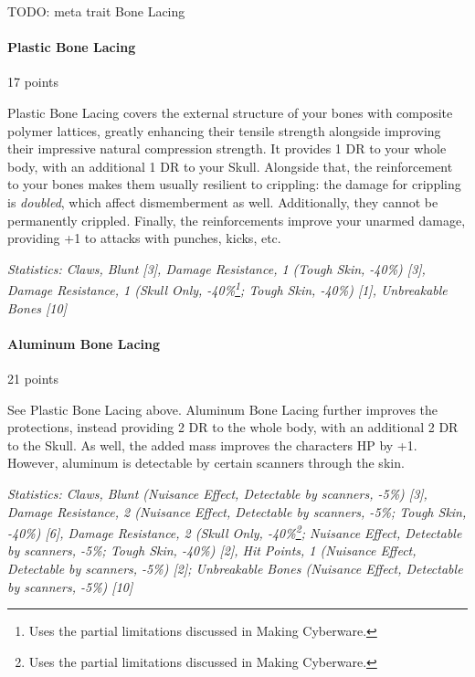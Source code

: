 \begin{multicols*}{3}
	TODO:  meta trait Bone Lacing 
	
	\paragraph{Plastic Bone Lacing}
	\begin{flushright}
		17 points
	\end{flushright}
	
	Plastic Bone Lacing covers the external structure of your bones with composite polymer lattices, greatly enhancing their tensile strength alongside improving their impressive natural compression strength. It provides 1 DR to your whole body, with an additional 1 DR to your Skull. Alongside that, the reinforcement to your bones makes them usually resilient to crippling: the damage for crippling is \textit{doubled}, which affect dismemberment as well. Additionally, they cannot be permanently crippled. Finally, the reinforcements improve your unarmed damage, providing +1 to attacks with punches, kicks, etc.
	
	\textit{\textcolor{OliveGreen}{Statistics: Claws, Blunt [3], Damage Resistance, 1 (Tough Skin, -40\%) [3], Damage Resistance, 1 (Skull Only, -40\%\footnote {Uses the partial limitations discussed in Making Cyberware.}; Tough Skin, -40\%) [1], Unbreakable Bones [10]}}
	
	\paragraph{Aluminum Bone Lacing}
	\begin{flushright}
		21 points
	\end{flushright}
	
	See Plastic Bone Lacing above. Aluminum Bone Lacing further improves the protections, instead providing 2 DR to the whole body, with an additional 2 DR to the Skull. As well, the added mass improves the characters HP by +1. However, aluminum is detectable by certain scanners through the skin.
	
	\textit{\textcolor{OliveGreen}{Statistics: Claws, Blunt (Nuisance Effect, Detectable by scanners,  -5\%) [3], Damage Resistance, 2 (Nuisance Effect, Detectable by scanners, -5\%; Tough Skin, -40\%) [6], Damage Resistance, 2 (Skull Only, -40\%\footnote {Uses the partial limitations discussed in Making Cyberware.}; Nuisance Effect, Detectable by scanners, -5\%; Tough Skin, -40\%) [2], Hit Points, 1 (Nuisance Effect, Detectable by scanners,  -5\%) [2]; Unbreakable Bones (Nuisance Effect, Detectable by scanners,  -5\%) [10]}}
	

\end{multicols*}
